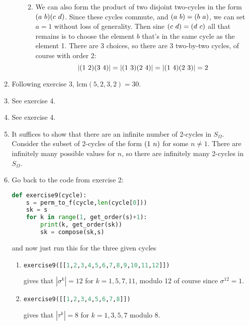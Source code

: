 \documentclass[]{article}
\newcommand{\abs}[1]{\left\vert #1 \right\vert}
\newcommand*{\cycle}[1]{( \foreach \entry [count=\i] in {#1} {\ifnum\i>1\ \fi\entry})}
\begin{document}
\begin{enumerate}
\begin{enumerate}
\begin{enumerate}
\begin{equation}
\end{equation}
\item We can also form the product of two disjoint two-cycles in the form $\cycle{a,b}\cycle{c,d}$. Since these cycles commute, and $\cycle{a,b} = \cycle{b,a}$, we can set $a=1$ without loss of generality. Then sine $\cycle{c,d} = \cycle{d,c}$ all that remains is to choose the element $b$ that's in the same cycle as the element 1. There are 3 choices, so there are 3 two-by-two cycles, of course with order 2:
\begin{equation}
\abs{\cycle{1,2}\cycle{3,4}} = \abs{\cycle{1,3}\cycle{2,4}} = \abs{\cycle{1,4}\cycle{2,3}} = 2
\end{equation}
\end{enumerate}
\end{enumerate}


\item Following exercise 3, $\text{lcm}(5,2,3,2) = 30$.


\item See exercise 4.


\item See exercise 4.


\item It suffices to show that there are an infinite number of 2-cycles in $S_\Omega$. Consider the subset of 2-cycles of the form $\cycle{1,n}$ for some $n\neq 1$. There are infinitely many possible values for $n$, so there are infinitely many 2-cycles in $S_\Omega$.


\item Go back to the code from exercise 2:
\begin{lstlisting}[language=Python]
def exercise9(cycle):
    s = perm_to_f(cycle,len(cycle[0]))
    sk = s
    for k in range(1, get_order(s)+1):
        print(k, get_order(sk))
        sk = compose(sk,s)
\end{lstlisting}
and now just run this for the three given cycles
\begin{enumerate}
\item \begin{lstlisting}[language=Python]
exercise9([[1,2,3,4,5,6,7,8,9,10,11,12]])
\end{lstlisting}
gives that $\abs{\sigma^k} = 12$ for $k = 1,5,7,11$, modulo 12 of course since $\sigma^{12} = 1$.

\item \begin{lstlisting}[language=Python]
exercise9([[1,2,3,4,5,6,7,8]])
\end{lstlisting}
gives that $\abs{\tau^k} = 8$ for $k = 1,3,5,7$ modulo 8.


\end{enumerate}
\end{enumerate}
\end{document}
